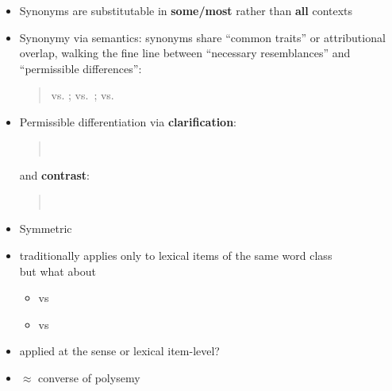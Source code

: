 \documentclass[headrule,footrule]{foils}
\begin{document}
\begin{itemize}
\item Synonyms are substitutable in \textbf{some/most} rather than \textbf{all} contexts
\item Synonymy via semantics: synonyms share ``common traits'' or
  attributional overlap, walking the fine line between ``necessary
  resemblances'' and ``permissible differences'':
  \begin{quote}
       vs. ;   vs.\ ;  vs. 
    \end{quote}
    \newpage
\item Permissible differentiation via \textbf{clarification}:
  \begin{quote}
    \\
  \end{quote}
  and \textbf{contrast}:
  \begin{quote}
    \\
  \end{quote}
\end{itemize}


  \begin{itemize}
  \item Symmetric
  \item traditionally applies only to lexical items of the same word
    class
    \\ but what about
    \begin{itemize}
    \item  {} vs 
    \item {} vs  
    \end{itemize}
  \item applied at the sense or lexical item-level?
  \item $\approx$ converse of polysemy
  \end{itemize}




\end{document}
